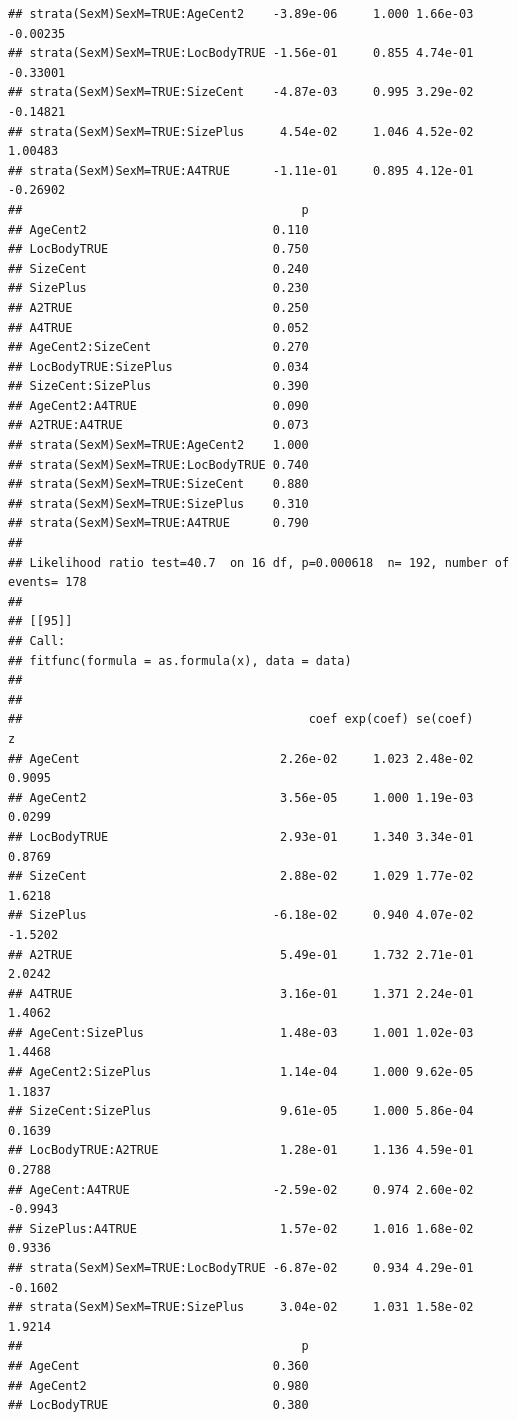 \documentclass{article}\usepackage[]{graphicx}\usepackage[]{color}
\makeatletter
\newenvironment{kframe}{%
 \def\at@end@of@kframe{}%
 \ifinner\ifhmode%
  \def\at@end@of@kframe{\end{minipage}}%
  \begin{minipage}{\columnwidth}%
 \fi\fi%
 \def\FrameCommand##1{\hskip\@totalleftmargin \hskip-\fboxsep
 \colorbox{shadecolor}{##1}\hskip-\fboxsep
     \hskip-\linewidth \hskip-\@totalleftmargin \hskip\columnwidth}%
 \MakeFramed {\advance\hsize-\width
   \@totalleftmargin\z@ \linewidth\hsize
   \@setminipage}}%
 {\par\unskip\endMakeFramed%
 \at@end@of@kframe}
\newenvironment{knitrout}{}{} %
\makeatother
\begin{document}
\begin{knitrout}
\begin{kframe}
\begin{verbatim}
## strata(SexM)SexM=TRUE:AgeCent2    -3.89e-06     1.000 1.66e-03 -0.00235
## strata(SexM)SexM=TRUE:LocBodyTRUE -1.56e-01     0.855 4.74e-01 -0.33001
## strata(SexM)SexM=TRUE:SizeCent    -4.87e-03     0.995 3.29e-02 -0.14821
## strata(SexM)SexM=TRUE:SizePlus     4.54e-02     1.046 4.52e-02  1.00483
## strata(SexM)SexM=TRUE:A4TRUE      -1.11e-01     0.895 4.12e-01 -0.26902
##                                       p
## AgeCent2                          0.110
## LocBodyTRUE                       0.750
## SizeCent                          0.240
## SizePlus                          0.230
## A2TRUE                            0.250
## A4TRUE                            0.052
## AgeCent2:SizeCent                 0.270
## LocBodyTRUE:SizePlus              0.034
## SizeCent:SizePlus                 0.390
## AgeCent2:A4TRUE                   0.090
## A2TRUE:A4TRUE                     0.073
## strata(SexM)SexM=TRUE:AgeCent2    1.000
## strata(SexM)SexM=TRUE:LocBodyTRUE 0.740
## strata(SexM)SexM=TRUE:SizeCent    0.880
## strata(SexM)SexM=TRUE:SizePlus    0.310
## strata(SexM)SexM=TRUE:A4TRUE      0.790
## 
## Likelihood ratio test=40.7  on 16 df, p=0.000618  n= 192, number of events= 178 
## 
## [[95]]
## Call:
## fitfunc(formula = as.formula(x), data = data)
## 
## 
##                                        coef exp(coef) se(coef)       z
## AgeCent                            2.26e-02     1.023 2.48e-02  0.9095
## AgeCent2                           3.56e-05     1.000 1.19e-03  0.0299
## LocBodyTRUE                        2.93e-01     1.340 3.34e-01  0.8769
## SizeCent                           2.88e-02     1.029 1.77e-02  1.6218
## SizePlus                          -6.18e-02     0.940 4.07e-02 -1.5202
## A2TRUE                             5.49e-01     1.732 2.71e-01  2.0242
## A4TRUE                             3.16e-01     1.371 2.24e-01  1.4062
## AgeCent:SizePlus                   1.48e-03     1.001 1.02e-03  1.4468
## AgeCent2:SizePlus                  1.14e-04     1.000 9.62e-05  1.1837
## SizeCent:SizePlus                  9.61e-05     1.000 5.86e-04  0.1639
## LocBodyTRUE:A2TRUE                 1.28e-01     1.136 4.59e-01  0.2788
## AgeCent:A4TRUE                    -2.59e-02     0.974 2.60e-02 -0.9943
## SizePlus:A4TRUE                    1.57e-02     1.016 1.68e-02  0.9336
## strata(SexM)SexM=TRUE:LocBodyTRUE -6.87e-02     0.934 4.29e-01 -0.1602
## strata(SexM)SexM=TRUE:SizePlus     3.04e-02     1.031 1.58e-02  1.9214
##                                       p
## AgeCent                           0.360
## AgeCent2                          0.980
## LocBodyTRUE                       0.380

\end{verbatim}
\end{kframe}
\end{knitrout}
\end{document}
